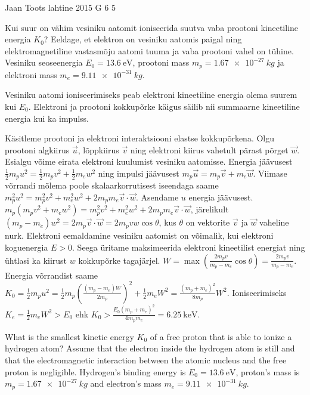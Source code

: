 {Jaan Toots} %
{lahtine} %
{2015} %
{G 6} %
{5} %
{
\ifStatement
Kui suur on vähim vesiniku aatomit ioniseerida suutva vaba prootoni kineetiline energia $K_0$? Eeldage, et elektron on vesiniku aatomis paigal ning elektromagnetiline vastasmõju aatomi tuuma ja vaba prootoni vahel on tühine. Vesiniku seoseenergia $E_0 = \SI{13.6}{\electronvolt}$, prootoni mass $m_p=\SI{1.67e-27}{kg}$ ja elektroni mass $m_e=\SI{9.11e-31}{kg}$.
\fi


\ifHint
Vesiniku aatomi ioniseerimiseks peab elektroni kineetiline energia olema suurem kui $E_0$. Elektroni ja prootoni kokkupõrke käigus säilib nii summaarne kineetiline energia kui ka impulss.
\fi


\ifSolution
Käsitleme prootoni ja elektroni interaktsiooni elastse kokkupõrkena. Olgu prootoni algkiirus $\vec{u}$, lõppkiirus $\vec{v}$ ning elektroni kiirus vahetult pärast põrget $\vec{w}$. Esialgu võime eirata elektroni kuulumist vesiniku aatomisse. Energia jäävusest $\frac{1}{2}m_p u^2 = \frac{1}{2}m_p v^2 + \frac{1}{2}m_e w^2$ ning impulsi jäävusest $m_p \vec{u} = m_p \vec{v} + m_e \vec{w}$. Viimase võrrandi mõlema poole skalaarkorrutisest iseendaga saame $m_p^2 u^2 = m_p^2 v^2 + m_e^2 w^2 + 2 m_p m_e \vec{v}\cdot \vec{w}$. Asendame $u$ energia jäävusest. $m_p ( m_p v^2 + m_e w^2 ) = m_p^2 v^2 + m_e^2 w^2 + 2 m_p m_e \vec{v}\cdot \vec{w}$, järelikult $( m_p - m_e ) w^2 = 2 m_p \vec{v}\cdot\vec{w} = 2 m_p vw \cos\theta$, kus $\theta$ on vektorite $\vec{v}$ ja $\vec{w}$ vaheline nurk. Elektroni eemaldamine vesiniku aatomist on võimalik, kui elektroni koguenergia $E>0$. Seega üritame maksimeerida elektroni kineetilist energiat ning ühtlasi ka kiirust $w$ kokkupõrke tagajärjel.
$W = \max\left(\frac{2 m_p v}{m_p - m_e}\cos\theta\right) = \frac{2 m_p v}{m_p - m_e}$. Energia võrrandist saame $K_0 = \frac{1}{2}m_p u^2 = \frac{1}{2}m_p \left(\frac{( m_p - m_e ) W}{2 m_p}\right)^2 + \frac{1}{2}m_e W^2 = \frac{(m_p + m_e)^2}{8 m_p} W^2$. Ioniseerimiseks $K_e = \frac{1}{2}m_e W^2 > E_0$ ehk $K_0 > \frac{E_0 (m_p + m_e)^2}{4 m_p m_e} = \SI{6.25}{\kilo\electronvolt}$.
\fi


\ifEngStatement
What is the smallest kinetic energy $K_0$ of a free proton that is able to ionize a hydrogen atom? Assume that the electron inside the hydrogen atom is still and that the electromagnetic interaction between the atomic nucleus and the free proton is negligible. Hydrogen’s binding energy is $E_0 = \SI{13.6}{\electronvolt}$, proton’s mass is $m_p=\SI{1.67e-27}{kg}$ and electron’s mass $m_e=\SI{9.11e-31}{kg}$.
\fi


}
